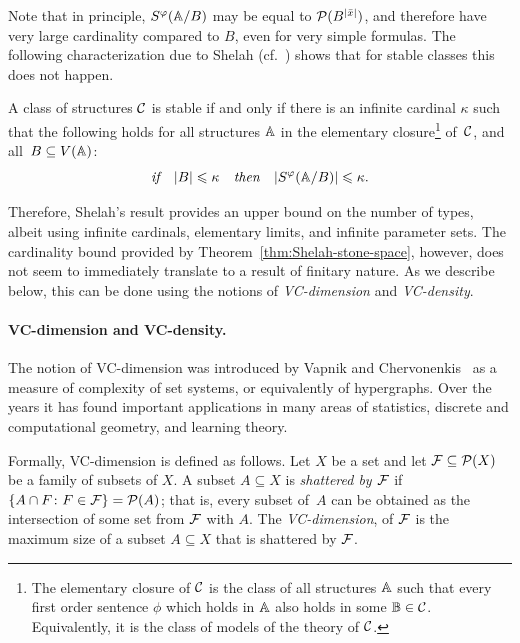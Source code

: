 Note that in principle, $S^\phi(\str A/B)$
may be equal to $\Pow(B^{|\bar x|})$, and therefore have very large cardinality compared to $B$, even for very simple formulas. 
The following characterization due to Shelah 
(cf.~\cite[Theorem 2.2, Chapter II]{shelah1990classification})
shows that for stable classes this does not happen.
\begin{theorem}\label{thm:Shelah-stone-space}
A class of structures $\cal C$
	is stable if and only if 
	there is 
	an infinite cardinal $\kappa$
	such that the following holds for all
	structures
	$\str A$ in the elementary closure\footnote{The elementary closure of $\cal C$ is 
	the class of all structures $\str A$
	such that  every first order sentence $\phi$
	which holds in $\str A$ also holds in some $\str B\in \cal C$. Equivalently, it is the class of 
   models of the theory of $\cal C$.} of~$\cal C$, and all~$B\subset V(\str A)$:
$$  \textit{if\quad}|B|\le \kappa\textit {\quad then\quad}
|S^\phi(\str A/B)|\le \kappa.$$
\end{theorem}
Therefore,
Shelah's result provides an upper bound on the number of types, albeit using infinite cardinals, elementary limits, and infinite parameter sets.
 The cardinality bound provided by Theorem~\ref{thm:Shelah-stone-space},
 however, does not seem to  immediately translate to a result of finitary nature. As we describe below,
 this can be done using the notions of {\em{VC-dimension}} and {\em{VC-density}}.

\paragraph{VC-dimension and VC-density.} The notion of VC-dimension was introduced by 
Vapnik and Chervonenkis~\cite{chervonenkis1971theory} as a measure of complexity of set systems, or equivalently of hypergraphs.
Over the years it
has found important applications in many areas of
statistics, discrete and computational geometry, 
and learning theory. 

Formally, VC-dimension is defined as follows. 
Let $X$ be a set and let  $\FFF\subseteq \Pow(X)$ 
be a family of subsets of $X$.
A subset $A\subseteq X$ is \emph{shattered by $\FFF$} if
$\{A\cap F\colon F\in \FFF\}=\Pow(A)$; that is, every subset of~$A$ can be obtained as the intersection of some set from $\FFF$ with $A$. 
The \emph{VC-dimension},
of $\FFF$ is the maximum size of a subset $A\subseteq X$ that is shattered by
$\FFF$.

